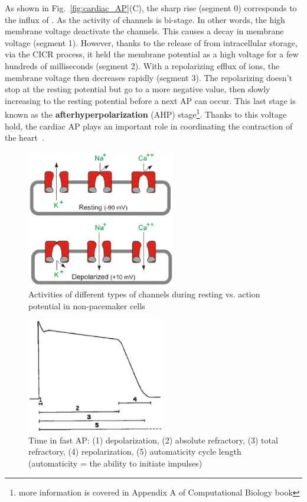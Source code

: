 As shown in Fig.~\ref{fig:cardiac_AP}(C), the sharp rise (segment 0)
corresponds to the influx of . As the activity of 
channels is bi-stage. In other words, the high membrane voltage
deactivate the  channels. This causes a decay in membrane
voltage (segment 1). However, thanks to the release of  from
intracellular storage, via the CICR process, it held the membrane
potential as a high voltage for a few hundreds of milliseconds
(segment 2).  With a repolarizing efflux of  ions, the membrane
voltage then decreases rapidly (segment 3). The repolarizing doesn't
stop at the resting potential but go to a more negative value, then
slowly increasing to the resting potential before a next AP can
occur. This last stage is known as the {\bf afterhyperpolarization}
(AHP) stage\footnote{more information is covered in Appendix A of
  Computational Biology book}.
Thanks to this voltage hold, the cardiac AP plays an important role in
coordinating the contraction of the heart~\cite{kleber2004bmc}.

\begin{figure}[hbt]
 \centerline{\includegraphics[height=6cm]{./images/channel_activation_AP.eps}}
 \caption{Activities of different types of channels during resting
   vs. action potential in non-pacemaker cells}
\label{fig:channel-activity}
\end{figure}

\begin{figure}[hbt]
  \centerline{\includegraphics[height=5cm,
    angle=0]{./images/time_fast_AP.eps}}
  \caption{Time in fast AP: (1) depolarization, (2) absolute
    refractory, (3) total refractory, (4) repolarization, (5)
    automaticity cycle length (automaticity = the ability to initiate impulses)}
\label{fig:fast_AP}
\end{figure}

